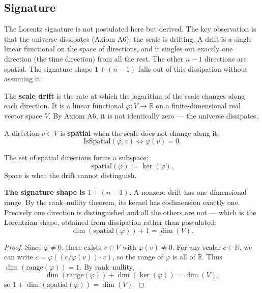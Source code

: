 \subsection{Signature}

The Lorentz signature is not postulated here but derived. The key observation is that the universe dissipates (Axiom A6): the scale is drifting. A drift is a single linear functional on the space of directions, and it singles out exactly one direction (the time direction) from all the rest. The other $n-1$ directions are spatial. The signature shape $1 + (n-1)$ falls out of this dissipation without assuming it.

\begin{definition}
The \textbf{scale drift} is the rate at which the logarithm of the scale changes along each direction. It is a linear functional $\varphi: V \to \mathbb{R}$ on a finite-dimensional real vector space $V$. By Axiom A6, it is not identically zero — the universe dissipates.
\end{definition}

\begin{definition}
A direction $v \in V$ is \textbf{spatial} when the scale does not change along it:
\[
\text{IsSpatial}(\varphi, v) \iff \varphi(v) = 0.
\]
\end{definition}

\begin{definition}
The set of spatial directions forms a subspace:
\[
\text{spatial}(\varphi) := \ker(\varphi).
\]
Space is what the drift cannot distinguish.
\end{definition}

\begin{theorem}
\textbf{The signature shape is $1 + (n-1)$.} A nonzero drift has one-dimensional range. By the rank–nullity theorem, its kernel has codimension exactly one. Precisely one direction is distinguished and all the others are not — which is the Lorentzian shape, obtained from dissipation rather than postulated:
\[
\dim(\text{spatial}(\varphi)) + 1 = \dim(V).
\]
\begin{proof}
Since $\varphi \neq 0$, there exists $v \in V$ with $\varphi(v) \neq 0$. For any scalar $c \in \mathbb{R}$, we can write $c = \varphi((c/\varphi(v)) \cdot v)$, so the range of $\varphi$ is all of $\mathbb{R}$. Thus $\dim(\text{range}(\varphi)) = 1$. By rank–nullity,
\[
\dim(\text{range}(\varphi)) + \dim(\ker(\varphi)) = \dim(V),
\]
so $1 + \dim(\text{spatial}(\varphi)) = \dim(V)$.
\end{proof}
\end{theorem}

